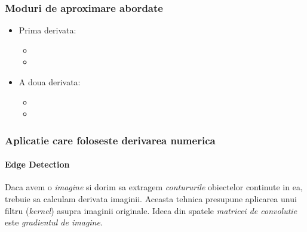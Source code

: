 \documentclass{article}
\begin{document}
\subsubsection{Moduri de aproximare abordate}
\begin{multicols}{2}
    \begin{itemize}
    
        \item Prima derivata:
        \begin{itemize}
            \item {}
            \item {}
        \end{itemize}
        
        \item A doua derivata:
        \begin{itemize}
            \item {}
            \item[]
        \end{itemize}
    
    \end{itemize}
\end{multicols}

\subsubsection{Aplicatie care foloseste derivarea numerica}
\paragraph{Edge Detection}

\tabto{0.5cm} Daca avem o \textit{imagine} si dorim sa extragem \textit{contururile} obiectelor continute in ea, trebuie sa calculam derivata imaginii\framebox[0.3cm][r]{\footnotemark}.\hspace{-0.125cm} Aceasta tehnica presupune aplicarea unui filtru (\textit{kernel}) asupra imaginii originale.
\hspace{-0.125cm} Ideea din spatele \textit{matricei de convolutie} este \textit{gradientul de imagine}\framebox[0.3cm][r]{\footnotemark}.\vspace{-0.25cm}
\end{document}
